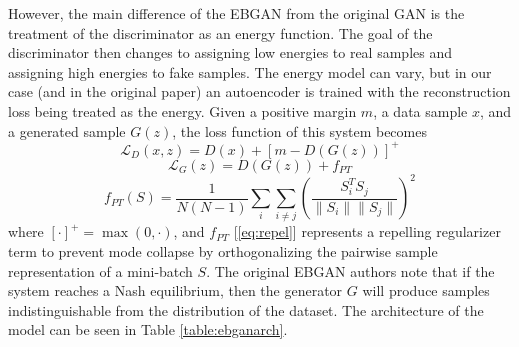\documentclass[10pt,twocolumn,letterpaper]{article}
\begin{document}
However, the main difference of the EBGAN from the original GAN is the treatment of the discriminator as an energy function. The goal of the discriminator then changes to assigning low energies to real samples and assigning high energies to fake samples. The energy model can vary, but in our case (and in the original paper) an autoencoder is trained with the reconstruction loss being treated as the energy. Given a positive margin $m$, a data sample $x$, and a generated sample $G(z)$, the loss function of this system becomes
\begin{equation}
\mathcal{L}_D(x,z) = D(x) + [m - D(G(z))]^+
\end{equation}
\begin{equation}
\mathcal{L}_G(z) = D(G(z)) + f_{PT}
\end{equation}
\begin{equation}
\label{eq:repel}
f_{PT}(S) = \frac{1}{N(N-1)}\sum_i \sum_{i \neq j} \left( \frac{S_i^T S_j}{\|S_i \| \| S_j \|} \right)^2
\end{equation}
where $[\cdot]^+=\max(0, \cdot)$, and $f_{PT}$ [\ref{eq:repel}] represents a repelling regularizer term to prevent mode collapse by orthogonalizing the pairwise sample representation of a mini-batch $S$. The original EBGAN authors note that if the system reaches a Nash equilibrium, then the generator $G$ will produce samples indistinguishable from the distribution of the dataset. The architecture of the model can be seen in Table \ref{table:ebganarch}.
\end{document}
